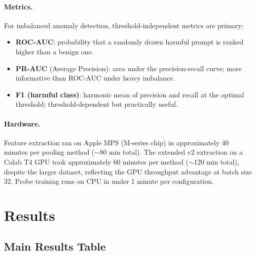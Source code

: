 \documentclass[11pt,a4paper]{article}
\begin{document}
\paragraph{Metrics.} For imbalanced anomaly detection, threshold-independent
metrics are primary:
\begin{itemize}[noitemsep]
  \item \textbf{ROC-AUC}: probability that a randomly drawn harmful prompt is
        ranked higher than a benign one.
  \item \textbf{PR-AUC} (Average Precision): area under the precision-recall
        curve; more informative than ROC-AUC under heavy imbalance.
  \item \textbf{F1 (harmful class)}: harmonic mean of precision and recall at
        the optimal threshold; threshold-dependent but practically useful.
\end{itemize}

\paragraph{Hardware.} Feature extraction ran on Apple MPS (M-series chip) in
approximately 40 minutes per pooling method ($\sim$80 min total). The extended v2 extraction on a Colab T4 GPU took approximately 60 minutes per method ($\sim$120 min total), despite the larger dataset, reflecting the GPU throughput advantage at batch size 32. Probe training runs on CPU in under 1 minute per configuration.

\section{Results}
\label{sec:results}

\subsection{Main Results Table}
\end{document}
